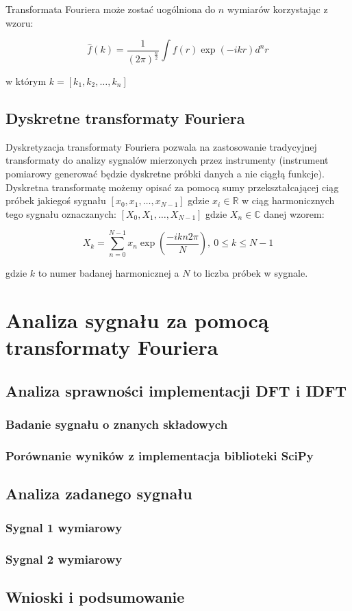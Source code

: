 \documentclass{artikel3}
\begin{document}
Transformata Fouriera może zostać uogólniona do $n$ wymiarów korzystając z wzoru:

\begin{equation}
    \hat{f}(k) = \frac{1}{{(2\pi)}^\frac{n}{2}} \int f(r) \exp{(-ikr)} d^n r
\end{equation}

w którym $k=[k_1,k_2,\ldots, k_n]$

\subsection*{Dyskretne transformaty Fouriera}
Dyskretyzacja transformaty Fouriera pozwala na zastosowanie tradycyjnej transformaty do analizy sygnalów mierzonych przez instrumenty (instrument pomiarowy generować będzie dyskretne próbki danych a nie ciągłą funkcje).
Dyskretna transformatę możemy opisać za pomocą sumy przekształcającej ciąg próbek jakiegoś sygnału $[x_0, x_1, \ldots, x_{N-1}]$ gdzie $x_i \in \mathbb{R}$ w ciąg harmonicznych tego sygnału oznaczanych: $[X_0, X_1, \ldots, X_{N-1}]$ gdzie $X_n \in \mathbb{C}$ danej wzorem:

\begin{equation}
    X_k = \sum_{n=0}^{N-1} x_n \exp{\left(\frac{-i k n 2\pi}{N}\right)} , \ 0 \le k \le N - 1
\end{equation}

gdzie $k$ to numer badanej harmonicznej a $N$ to liczba próbek w sygnale.

\section{Analiza sygnału za pomocą transformaty Fouriera}

\subsection{Analiza sprawności implementacji DFT i IDFT }

\subsubsection{Badanie sygnału o znanych składowych}

\subsubsection{Porównanie wyników z implementacja biblioteki SciPy}


\subsection{Analiza zadanego sygnału}

\subsubsection{Sygnal 1 wymiarowy}

\subsubsection{Sygnal 2 wymiarowy}

\subsection{Wnioski i podsumowanie}
\end{document}
